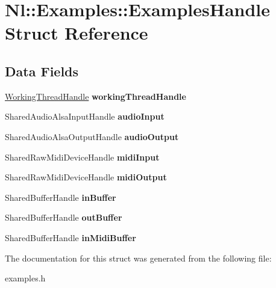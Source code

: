 \hypertarget{structNl_1_1Examples_1_1ExamplesHandle}{\section{Nl\-:\-:Examples\-:\-:Examples\-Handle Struct Reference}
\label{structNl_1_1Examples_1_1ExamplesHandle}
}
\subsection*{Data Fields}
\begin{DoxyCompactItemize}
\item 
\hypertarget{structNl_1_1Examples_1_1ExamplesHandle_a0d1e30621f3e8f6950b0616931400faa}{\hyperlink{structNl_1_1WorkingThreadHandle}{Working\-Thread\-Handle} {\bfseries working\-Thread\-Handle}}\label{structNl_1_1Examples_1_1ExamplesHandle_a0d1e30621f3e8f6950b0616931400faa}

\item 
\hypertarget{structNl_1_1Examples_1_1ExamplesHandle_abe979ca186fa83e4dacf5a41285331ca}{Shared\-Audio\-Alsa\-Input\-Handle {\bfseries audio\-Input}}\label{structNl_1_1Examples_1_1ExamplesHandle_abe979ca186fa83e4dacf5a41285331ca}

\item 
\hypertarget{structNl_1_1Examples_1_1ExamplesHandle_a4bc4e620f15e3b007e0135bf91a71203}{Shared\-Audio\-Alsa\-Output\-Handle {\bfseries audio\-Output}}\label{structNl_1_1Examples_1_1ExamplesHandle_a4bc4e620f15e3b007e0135bf91a71203}

\item 
\hypertarget{structNl_1_1Examples_1_1ExamplesHandle_a22c33e03ee14bc6021a5d7f845fef9a7}{Shared\-Raw\-Midi\-Device\-Handle {\bfseries midi\-Input}}\label{structNl_1_1Examples_1_1ExamplesHandle_a22c33e03ee14bc6021a5d7f845fef9a7}

\item 
\hypertarget{structNl_1_1Examples_1_1ExamplesHandle_affaa70f0a63574795be6b236f965ea45}{Shared\-Raw\-Midi\-Device\-Handle {\bfseries midi\-Output}}\label{structNl_1_1Examples_1_1ExamplesHandle_affaa70f0a63574795be6b236f965ea45}

\item 
\hypertarget{structNl_1_1Examples_1_1ExamplesHandle_a58489b3f687ec43b735db026bd51a71d}{Shared\-Buffer\-Handle {\bfseries in\-Buffer}}\label{structNl_1_1Examples_1_1ExamplesHandle_a58489b3f687ec43b735db026bd51a71d}

\item 
\hypertarget{structNl_1_1Examples_1_1ExamplesHandle_a9319496121f4206385a8cf93ead31ab5}{Shared\-Buffer\-Handle {\bfseries out\-Buffer}}\label{structNl_1_1Examples_1_1ExamplesHandle_a9319496121f4206385a8cf93ead31ab5}

\item 
\hypertarget{structNl_1_1Examples_1_1ExamplesHandle_af5c789ce836b431adcbba915f0bf995b}{Shared\-Buffer\-Handle {\bfseries in\-Midi\-Buffer}}\label{structNl_1_1Examples_1_1ExamplesHandle_af5c789ce836b431adcbba915f0bf995b}

\end{DoxyCompactItemize}


The documentation for this struct was generated from the following file\-:\begin{DoxyCompactItemize}
\item 
examples.\-h\end{DoxyCompactItemize}
